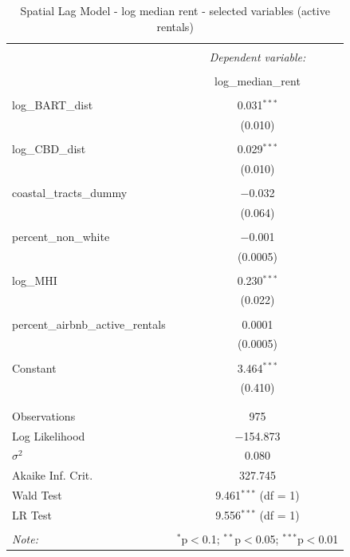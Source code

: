 \documentclass[10pt, letterpaper]{amsart}
\begin{document}
\begin{table}[!htbp] \centering 
  \caption{Spatial Lag Model - log median rent - selected variables (active rentals)} 
  \label{} 
  \begin{tabular}{@{\extracolsep{5pt}}lc} 
    \\[-1.8ex]\hline 
    \hline \\[-1.8ex] 
    & \multicolumn{1}{c}{\textit{Dependent variable:}} \\ 
    \cline{2-2} 
    \\[-1.8ex] & log\_median\_rent \\ 
    \hline \\[-1.8ex] 
    log\_BART\_dist & 0.031$^{***}$ \\
    & (0.010) \\ 
    & \\ 
    log\_CBD\_dist & 0.029$^{***}$ \\ 
    & (0.010) \\ 
    & \\ 
    coastal\_tracts\_dummy & $-$0.032 \\ 
    & (0.064) \\ 
    & \\ 
    percent\_non\_white & $-$0.001 \\ 
    & (0.0005) \\ 
    & \\ 
    log\_MHI & 0.230$^{***}$ \\ 
    & (0.022) \\ 
    & \\ 
    percent\_airbnb\_active\_rentals & 0.0001 \\ 
    & (0.0005) \\ 
    & \\ 
    Constant & 3.464$^{***}$ \\ 
    & (0.410) \\ 
    & \\ 
    \hline \\[-1.8ex] 
    Observations & 975 \\ 
    Log Likelihood & $-$154.873 \\ 
    $\sigma^{2}$ & 0.080 \\ 
    Akaike Inf. Crit. & 327.745 \\ 
    Wald Test & 9.461$^{***}$ (df = 1) \\ 
    LR Test & 9.556$^{***}$ (df = 1) \\ 
    \hline 
    \hline \\[-1.8ex] 
    \textit{Note:}  & \multicolumn{1}{r}{$^{*}$p$<$0.1; $^{**}$p$<$0.05; $^{***}$p$<$0.01} \\ 
  \end{tabular} 
\end{table} 
\end{document}
